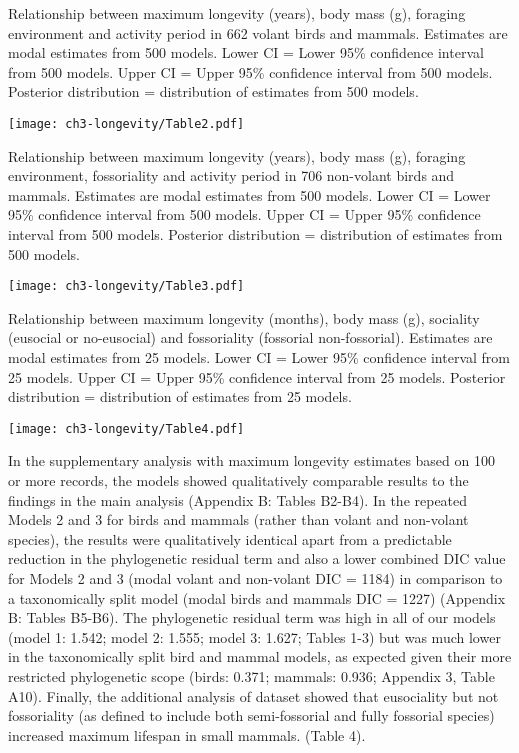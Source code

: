 \begin{table}[h]
  \caption[Table 2.]{Relationship between maximum longevity (years), body mass (g), foraging environment and activity period in 662 volant birds and mammals. Estimates are modal estimates from 500 models. Lower CI = Lower 95\% confidence interval from 500 models. Upper CI = Upper 95\% confidence interval from 500 models. Posterior distribution = distribution of estimates from 500 models.}
  \label{tbl:Table 2.}
  \texttt{[image: ch3-longevity/Table2.pdf]}
\end{table}


\begin{table}[h]
  \caption[Table 3.]{Relationship between maximum longevity (years), body mass (g), foraging environment, fossoriality and activity period in 706 non-volant birds and mammals. Estimates are modal estimates from 500 models. Lower CI = Lower 95\% confidence interval from 500 models. Upper CI = Upper 95\% confidence interval from 500 models. Posterior distribution = distribution of estimates from 500 models.}
  \label{tbl:Table 3.}
  \texttt{[image: ch3-longevity/Table3.pdf]}
\end{table}


\begin{table}[h!]
  \caption[Table 4.]{Relationship between maximum longevity (months), body mass (g), sociality (eusocial or no-eusocial) and fossoriality (fossorial non-fossorial). Estimates are modal estimates from 25 models. Lower CI = Lower 95\% confidence interval from 25 models. Upper CI = Upper 95\% confidence interval from 25 models. Posterior distribution = distribution of estimates from 25 models.}
  \label{tbl:Table 4.}
  \texttt{[image: ch3-longevity/Table4.pdf]}
\end{table}



In the supplementary analysis with maximum longevity estimates based on 100 or more records, the models showed qualitatively comparable results to the findings in the main analysis (Appendix B: Tables B2-B4). In the repeated Models 2 and 3 for birds and mammals (rather than volant and non-volant species), the results were qualitatively identical apart from a predictable reduction in the phylogenetic residual term and also a lower combined DIC value for Models 2 and 3 (modal volant and non-volant DIC = 1184) in comparison to a taxonomically split model (modal birds and mammals DIC  = 1227) (Appendix B: Tables B5-B6). The phylogenetic residual term was high in all of our models (model 1: 1.542; model 2: 1.555; model 3: 1.627; Tables 1-3) but was much lower in the taxonomically split bird and mammal models, as expected given their more restricted phylogenetic scope (birds: 0.371; mammals: 0.936; Appendix 3, Table A10). Finally, the additional analysis of \cite{williams2015ecology} dataset showed that eusociality but not fossoriality (as defined to include both semi-fossorial and fully fossorial species) increased maximum lifespan in small mammals. (Table 4).



